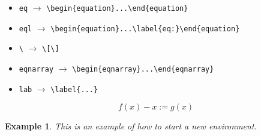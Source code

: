 \documentclass[a4paper,11pt]{article}
\newtheorem{example}{Example}
\begin{document}
\begin{itemize}
	\item \verb|eq| $\rightarrow$ \verb|\begin{equation}...\end{equation}|
	\item \verb|eql| $\rightarrow$ \verb|\begin{equation}...\label{eq:}\end{equation}|
	\item \verb|\| $\rightarrow$ \verb|\[\]|
	\item \verb|eqnarray| $\rightarrow$ \verb|\begin{eqnarray}...\end{eqnarray}|
	\item \verb|lab| $\rightarrow$ \verb|\label{...}|
\end{itemize}

\begin{equation}
  f(x) - x := g(x)  \label{eq:defined_eq}
\end{equation}

\begin{example}
  This is an example of how to start a new environment.	
\end{example}
\end{document}

